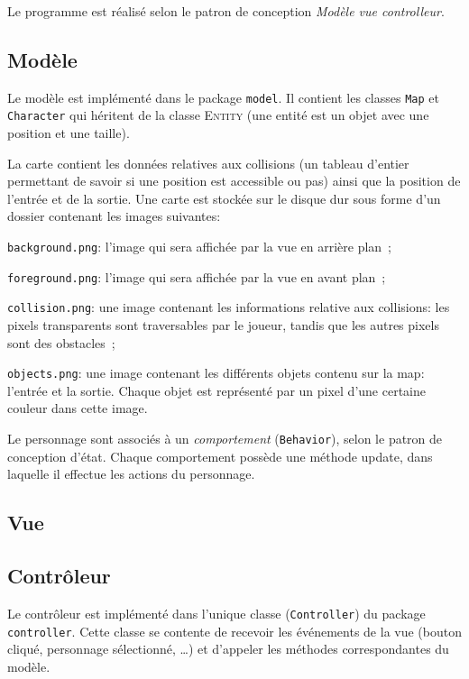 \documentclass[a4paper,12pt]{article}
\begin{document}
Le programme est réalisé selon le patron de conception
\emph{Modèle vue controlleur}.

\subsection{Modèle}

Le modèle est implémenté dans le package \texttt{model}. Il
contient les classes \texttt{Map} et \texttt{Character} qui
héritent de la classe \textsc{Entity} (une entité est un
objet avec une position et une taille).

La carte contient les données relatives aux collisions (un
tableau d'entier permettant de savoir si une position est
accessible ou pas) ainsi que la position de l'entrée et de
la sortie. Une carte est stockée sur le disque dur sous
forme d'un dossier contenant les images suivantes:
\begin{list}{-}{}
  \item \texttt{background.png}: l'image qui sera affichée
par la vue en arrière plan~;
  \item \texttt{foreground.png}: l'image qui sera affichée
par la vue en avant plan~;
  \item \texttt{collision.png}: une image contenant les
informations relative aux collisions: les pixels
transparents sont traversables par le joueur, tandis que les
autres pixels sont des obstacles~;
  \item \texttt{objects.png}: une image contenant les
différents objets contenu sur la map: l'entrée et la sortie.
Chaque objet est représenté par un pixel d'une certaine
couleur dans cette image.
\end{list}

Le personnage sont associés à un \emph{comportement}
(\texttt{Behavior}), selon le patron de conception d'état.
Chaque comportement possède une méthode update, dans
laquelle il effectue les actions du personnage.


\subsection{Vue}

\subsection{Contrôleur}
Le contrôleur est implémenté dans l'unique classe
(\texttt{Controller}) du package \texttt{controller}. Cette
classe se contente de recevoir les événements de la vue
(bouton cliqué, personnage sélectionné, \dots) et d'appeler
les méthodes correspondantes du modèle.
\end{document}
